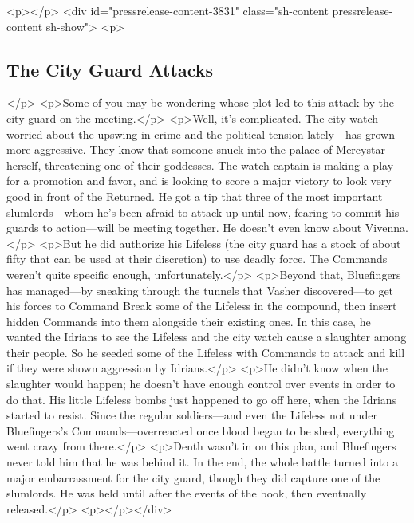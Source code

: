 <p></p>
<div id="pressrelease-content-3831" class="sh-content pressrelease-content sh-show">
<p>\subsection*{The City Guard Attacks}</p>
<p>Some of you may be wondering whose plot led to this attack by the city guard on the meeting.</p>
<p>Well, it’s complicated. The city watch—worried about the upswing in crime and the political tension lately—has grown more aggressive. They know that someone snuck into the palace of Mercystar herself, threatening one of their goddesses. The watch captain is making a play for a promotion and favor, and is looking to score a major victory to look very good in front of the Returned. He got a tip that three of the most important slumlords—whom he’s been afraid to attack up until now, fearing to commit his guards to action—will be meeting together. He doesn’t even know about Vivenna.</p>
<p>But he did authorize his Lifeless (the city guard has a stock of about fifty that can be used at their discretion) to use deadly force. The Commands weren’t quite specific enough, unfortunately.</p>
<p>Beyond that, Bluefingers has managed—by sneaking through the tunnels that Vasher discovered—to get his forces to Command Break some of the Lifeless in the compound, then insert hidden Commands into them alongside their existing ones. In this case, he wanted the Idrians to see the Lifeless and the city watch cause a slaughter among their people. So he seeded some of the Lifeless with Commands to attack and kill if they were shown aggression by Idrians.</p>
<p>He didn’t know when the slaughter would happen; he doesn’t have enough control over events in order to do that. His little Lifeless bombs just happened to go off here, when the Idrians started to resist. Since the regular soldiers—and even the Lifeless not under Bluefingers’s Commands—overreacted once blood began to be shed, everything went crazy from there.</p>
<p>Denth wasn’t in on this plan, and Bluefingers never told him that he was behind it. In the end, the whole battle turned into a major embarrassment for the city guard, though they did capture one of the slumlords. He was held until after the events of the book, then eventually released.</p>
<p></p></div>



